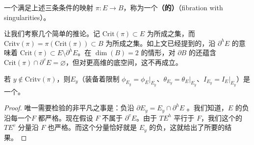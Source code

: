 一个满足上述三条条件的映射 $\pi\colon E\to B$，称为一个\textbf{（\trExactSymplectic{}的）\trFibrationWithSingularities}（fibration with singularities）。

让我们考察几个简单的推论。记 $\mathrm{Crit}(\pi)\subset E$ 为\trCriticalPoint{}所成之集，而 $\mathrm{Critv}(\pi)=\pi(\mathrm{Crit}(\pi))\subset B$ 为\trCriticalValue{}所成之集。如上文已经提到的，沿 $\partial^h E$ 的\trRegularity{}意味着 $\mathrm{Crit}(\pi)\subset E\setminus\partial^h E$。在 $\dim(B)=2$ 的情形，对 $\partial B$ 的\trTransversality{}还蕴含 $\mathrm{Crit}(\pi)\cap\partial^v E=\varnothing$，但对更高维的底空间，这不再成立。
\begin{lemma}\label{thm:fibre-exact-symplectic}
若 $y\notin\mathrm{Critv}(\pi)$，则\trFiber{}$E_y$（装备着限制 $\phi_{E_y}=\phi_E|_{E_y}$、$\theta_{E_y}=\theta_E|_{E_y}$、$I_{E_y}=I_E|_{E_y}$）是一个\trExactSymplectic\trCorneredBoundary\trManifold。
\end{lemma}
\begin{proof}
唯一需要检验的非平凡之事是：负\trLiouville\trVectorField{}沿 $\partial E_y=E_y\cap\partial^h E$ \trIncoming。我们知道，$E$ 的负\trLiouville\trVectorField{}沿每一个\trBoundaryFace{}$F$ 都严格\trIncoming。现在假设 $F$ 不属于 $\partial^v E$。由于 $TE^h$ 平行于 $F$，我们这个\trVectorField{}的 $TE^v$ 分量沿 $F$ 也严格\trIncoming。而这个分量恰好就是 $E_y$ 的负\trLiouville\trVectorField，这就给出了所要的结果。
\end{proof}

